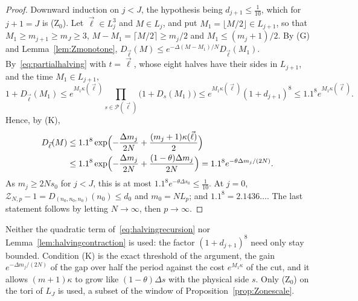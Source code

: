 \begin{proof}
Downward induction on $j<J$, the hypothesis being $d_{j+1}\le\frac1{10}$,
which for $j+1=J$ is (Z$_0$). Let $\vec\ell\in L_j^3$ and $M\in L_j$, and put
$M_1=\lfloor M/2\rfloor\in L_{j+1}$, so that $M_1\ge m_{j+1}\ge m_J\ge3$,
$M-M_1=\lceil M/2\rceil\ge m_j/2$ and $M_1\le(m_j+1)/2$. By (G) and
Lemma~\ref{lem:Zmonotone}, $D_{\vec\ell}(M)\le e^{-\Delta(M-M_1)/N}
D_{\vec\ell}(M_1)$. By~\eqref{eq:partialhalving} with $t=\vec\ell$, whose
eight halves have their sides in $L_{j+1}$, and the time $M_1\in L_{j+1}$,
\[
1+D_{\vec\ell}(M_1)\le e^{M_1\kappa(\vec\ell)}\prod_{s\in\mathcal P(\vec\ell)}
\bigl(1+D_s(M_1)\bigr)\le e^{M_1\kappa(\vec\ell)}(1+d_{j+1})^8\le1.1^8
e^{M_1\kappa(\vec\ell)} .
\]
Hence, by (K),
\begin{align*}
D_{\vec\ell}(M)&\le1.1^8\exp\Bigl(-\frac{\Delta m_j}{2N}+\frac{(m_j+1)
\kappa(\vec\ell)}2\Bigr)\\
&\le1.1^8\exp\Bigl(-\frac{\Delta m_j}{2N}+\frac{(1-\theta)\Delta m_j}{2N}
\Bigr)=1.1^8e^{-\theta\Delta m_j/(2N)} .
\end{align*}
As $m_j\ge2Ns_0$ for $j<J$, this is at most $1.1^8e^{-\theta\Delta s_0}\le
\frac1{10}$. At $j=0$, $\mathcal Z_{N,p}-1=D_{(n_0,n_0,n_0)}(n_0)\le d_0$ and
$m_0=NL_p$; and $1.1^8=2.1436\ldots$. The last statement follows by
letting $N\to\infty$, then $p\to\infty$.
\end{proof}

Neither the quadratic term of~\eqref{eq:halvingrecursion} nor
Lemma~\ref{lem:halvingcontraction} is used: the factor $(1+d_{j+1})^8$ need
only stay bounded. Condition (K) is the exact threshold of the argument,
the gain $e^{-\Delta m_j/(2N)}$ of the gap over half the period against the
cost $e^{M_1\kappa}$ of the cut, and it allows $(m+1)\kappa$ to grow like
$(1-\theta)\Delta s$ with the physical side $s$. Only (Z$_0$) on the tori of
$L_J$ is used, a subset of the window of Proposition~\ref{prop:Zonescale}.

